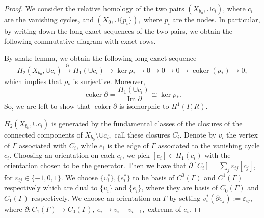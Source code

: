 \documentclass[a4paper,12 pt,titlepage,twoside]{book}
\newcommand*{\isoarrow}[1]{\arrow[#1,"\rotatebox{90}{\(\sim\)}"]}
\newcommand{\epsi}{\varepsilon}
\DeclareMathOperator{\Ima}{Im}
\DeclareMathOperator{\coker}{coker}
\theoremstyle{plain}
\theoremstyle{theorem}
\theoremstyle{definition}
\theoremstyle{remark}
\begin{document}
	\begin{proof}
		We consider the relative homology of the two pairs $(X_{b_0}, \cup c_i)$, where $c_i$ are the vanishing cycles, and $(X_0, \cup \{p_i\}),$ where $p_i$ are the nodes. In particular, by writing down the long exact sequences of the two pairs, we obtain the following commutative diagram with exact rows. \begin{center}
		\end{center}
		By snake lemma, we obtain the following long exact sequence $$ H_2(X_{b_0}, \cup c_i) \stackrel{\partial}{\longrightarrow} H_1(\cup c_i) \rightarrow \ker \rho_* \rightarrow 0 \rightarrow 0 \rightarrow 0 \rightarrow \coker(\rho_*) \rightarrow 0,$$ which implies that $\rho_*$ is surjective. Moreover, $$\coker \partial = \frac{H_1(\cup c_i)}{\Ima \partial} \cong \ker \rho_*.$$ So, we are left to show that $\coker \partial$ is isomorphic to $H^1(\Gamma,R)$. 
		
		$H_2(X_{b_0}, \cup c_i)$ is generated by the fundamental classes of the closures of the connected components of $X_{b_0} \setminus \cup c_i,$ call these closures $C_i.$ Denote by $v_i$ the vertex of $\Gamma$ associated with $C_i$, while $e_i$ is the edge of $\Gamma$ associated to the vanishing cycle $c_i$. Choosing an orientation on each $c_i$, we pick $[c_i] \in H_1(c_i)$ with the orientation chosen to be the generator. Then we have that $\partial[C_i] = \sum_j \epsi_{ij} [c_j]$, for $\epsi_{ij} \in \{-1,0,1\}.$ We choose $\{v_i^*\}, \{e_i^*\}$ to be basis of $C^0(\Gamma)$ and $C^1(\Gamma)$ respectively which are dual to $\{v_i\}$ and $\{e_i\}$, where they are basis of $C_0(\Gamma)$ and $C_1(\Gamma)$ respectively. We choose an orientation on $\Gamma$ by setting $v_i^*(\partial e_j) := \epsi_{ij},$ where $\partial \colon C_1(\Gamma)\rightarrow C_0(\Gamma), \ e_i \rightarrow v_i - v_{i-1},$ extrema of $e_i$. 
		

\end{proof}
\end{document}
